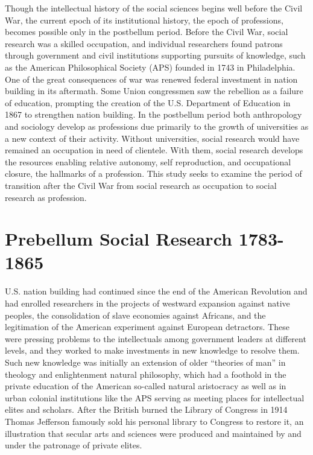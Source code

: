 \documentclass[]{book}
\begin{document}
Though the intellectual history of the social sciences begins well
before the Civil War, the current epoch of its institutional history,
the epoch of professions, becomes possible only in the postbellum
period. Before the Civil War, social research was a skilled occupation,
and individual researchers found patrons through government and civil
institutions supporting pursuits of knowledge, such as the American
Philosophical Society (APS) founded in 1743 in Philadelphia. One of the
great consequences of war was renewed federal investment in nation
building in its aftermath. Some Union congressmen saw the rebellion as a
failure of education, prompting the creation of the U.S. Department of
Education in 1867 to strengthen nation building. In the postbellum
period both anthropology and sociology develop as professions due
primarily to the growth of universities as a new context of their
activity. Without universities, social research would have remained an
occupation in need of clientele. With them, social research develops the
resources enabling relative autonomy, self reproduction, and
occupational closure, the hallmarks of a profession. This study seeks to
examine the period of transition after the Civil War from social
research as occupation to social research as profession.

\section{Prebellum Social Research
1783-1865}\label{prebellum-social-research-1783-1865}

U.S. nation building had continued since the end of the American
Revolution and had enrolled researchers in the projects of westward
expansion against native peoples, the consolidation of slave economies
against Africans, and the legitimation of the American experiment
against European detractors. These were pressing problems to the
intellectuals among government leaders at different levels, and they
worked to make investments in new knowledge to resolve them. Such new
knowledge was initially an extension of older ``theories of man'' in
theology and enlightenment natural philosophy, which had a foothold in
the private education of the American so-called natural aristocracy as
well as in urban colonial institutions like the APS serving as meeting
places for intellectual elites and scholars. After the British burned
the Library of Congress in 1914 Thomas Jefferson famously sold his
personal library to Congress to restore it, an illustration that secular
arts and sciences were produced and maintained by and under the
patronage of private elites.
\end{document}

